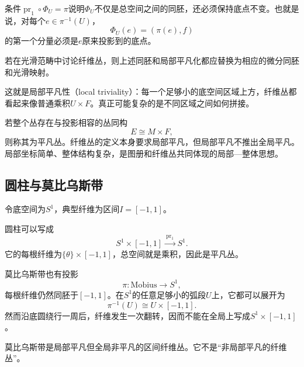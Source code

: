 条件$\operatorname{pr}_1\circ\Phi_U=\pi$说明$\Phi_U$不仅是总空间之间的同胚，还必须保持底点不变。也就是说，对每个$e\in\pi^{-1}(U)$，
\[
    \Phi_U(e)=(\pi(e),f)
\]
的第一个分量必须是$e$原来投影到的底点。

若在光滑范畴中讨论纤维丛，则上述同胚和局部平凡化都应替换为相应的微分同胚和光滑映射。

\begin{center}
\end{center}

这就是局部平凡性（local triviality）：每一个足够小的底空间区域上方，纤维丛都看起来像普通乘积$U\times F$。真正可能复杂的是不同区域之间如何拼接。

\begin{remark}[平凡与局部平凡]
若整个丛存在与投影相容的丛同构
\[
    E\cong M\times F,
\]
则称其为平凡丛。纤维丛的定义本身要求局部平凡，但局部平凡不推出全局平凡。局部坐标简单、整体结构复杂，是图册和纤维丛共同体现的局部—整体思想。
\end{remark}

\subsection{圆柱与莫比乌斯带}

令底空间为$S^1$，典型纤维为区间$I=[-1,1]$。

圆柱可以写成
\[
    S^1\times[-1,1]\xrightarrow{\ \operatorname{pr}_1\ }S^1.
\]
它的每根纤维为$\{\theta\}\times[-1,1]$，总空间就是乘积，因此是平凡丛。

莫比乌斯带也有投影
\[
    \pi:\mathrm{Mobius}\longrightarrow S^1,
\]
每根纤维仍然同胚于$[-1,1]$。在$S^1$的任意足够小的弧段$U$上，它都可以展开为
\[
    \pi^{-1}(U)\cong U\times[-1,1].
\]
然而沿底圆绕行一周后，纤维发生一次翻转，因而不能在全局上写成$S^1\times[-1,1]$。

\begin{proposition}
莫比乌斯带是局部平凡但全局非平凡的区间纤维丛。它不是“非局部平凡的纤维丛”。
\end{proposition}

